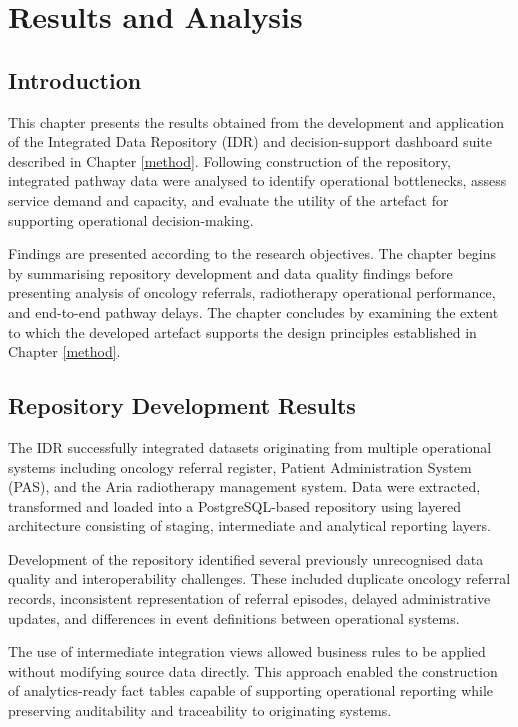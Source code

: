 \chapter{Results and Analysis}\label{results}
\section{Introduction}
This chapter presents the results obtained from the development and application of the Integrated Data Repository (IDR) and decision-support dashboard suite described in Chapter \ref{method}. Following construction of the repository, integrated pathway data were analysed to identify operational bottlenecks, assess service demand and capacity, and evaluate the utility of the artefact for supporting operational decision-making. 

Findings are presented according to the research objectives. The chapter begins by summarising repository development and data quality findings before presenting analysis of oncology referrals, radiotherapy operational performance, and end-to-end pathway delays. The chapter concludes by examining the extent to which the developed artefact supports the design principles established in Chapter \ref{method}.

\section{Repository Development Results}
The IDR successfully integrated datasets originating from multiple operational systems including oncology referral register, Patient Administration System (PAS), and the Aria radiotherapy management system. Data were extracted, transformed and loaded into a PostgreSQL-based repository using layered architecture consisting of staging, intermediate and analytical reporting layers. 

Development of the repository identified several previously unrecognised data quality and interoperability challenges. These included duplicate oncology referral records, inconsistent representation of referral episodes, delayed administrative updates, and differences in event definitions between operational systems. 

The use of intermediate integration views allowed business rules to be applied without modifying source data directly. This approach enabled the construction of analytics-ready fact tables capable of supporting operational reporting while preserving auditability and traceability to originating systems. 

